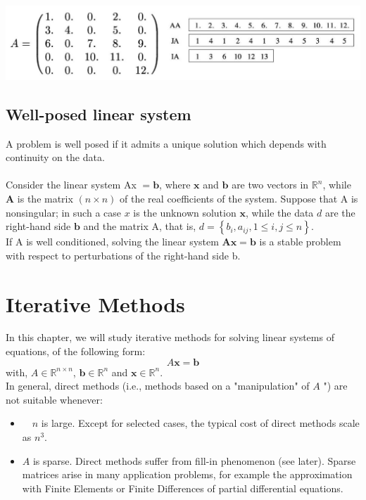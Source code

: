 \documentclass[11pt]{book}
\begin{document}
\begin{center}
\includegraphics[max width=\textwidth]{2023_09_05_b72ccc85584d9dc6fb5cg-026}
\end{center}

\section*{Well-posed linear system}
A problem is well posed if it admits a unique solution  which depends with continuity on the data.\\ \\
Consider the linear system Ax $=\mathbf{b}$, where $\mathbf{x}$ and $\mathbf{b}$ are two vectors in $\mathbb{R}^n$, while $\mathbf{A}$ is the matrix $(n \times n)$ of the real coefficients of the system. Suppose that A is nonsingular; in such a case $x$ is the unknown solution $\mathbf{x}$, while the data $d$ are the right-hand side $\mathbf{b}$ and the matrix A, that is, $d=\left\{b_i, a_{i j}, 1 \leq i, j \leq n\right\}$.\\ 
If $\mathrm{A}$ is well conditioned, solving the linear system $\mathbf{A x}=\mathbf{b}$ is a stable problem with respect to perturbations of the right-hand side b. 


\newpage

\chapter{Iterative Methods}
In this chapter, we will study iterative methods for solving linear systems of equations, of the following form:
$$A \boldsymbol{x}=\boldsymbol{b}$$with, $A \in \mathbb{R}^{n \times n}$, $\boldsymbol{b} \in \mathbb{R}^{n}$ and $\boldsymbol{x} \in \mathbb{R}^{n}$.\\
In general, direct methods (i.e., methods based on a "manipulation" of $A$ ") are not suitable whenever:

\begin{itemize}
  \item $\quad n$ is large. Except for selected cases, the typical cost of direct methods scale as $n^{3}$.
  \item $A$ is sparse. Direct methods suffer from fill-in phenomenon (see later). Sparse matrices arise in many application problems, for example the approximation with Finite Elements or Finite Differences of partial differential equations.
\end{itemize}
\end{document}
